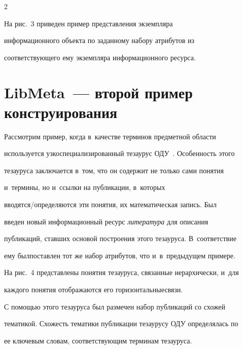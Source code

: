 \begin{multicols}{2}




На рис.~3 приведен пример представления экземпляра 

информационного объекта по заданному набору атрибутов из 

соответствующего ему экземпляра информационного ресурса.



\section{LibMeta~--- второй пример конструирования}



    Рассмотрим пример, когда в~качестве терминов предметной области 

используется узкоспециализированный тезаурус ОДУ~\cite{8-ser}. Особенность этого 

тезауруса заключается в~том, что он содержит не только сами понятия 

и~термины, но и~ссылки на публикации, в~которых  

вво\-дят\-ся/опре\-де\-ля\-ют\-ся эти понятия, их математическая запись. Был 

введен новый информационный ресурс \textit{литература} для описания 

публикаций, ставших основой построения этого тезауруса. В~соответствие 

ему был\linebreak поставлен тот же набор атрибутов, что и~в~преды\-ду\-щем примере. 

На рис.~4 представлены понятия тезауруса, связанные иерархически, и~для 

каж\-дого понятия отображаются его горизонтальные\linebreak связи.

{ %



}





    С помощью этого тезауруса был размечен набор публикаций со схожей 

тематикой. Схожесть тематики публикации тезаурусу ОДУ определялась по 

ее ключевым словам, соответствующим терминам тезауруса. 




\end{multicols}

